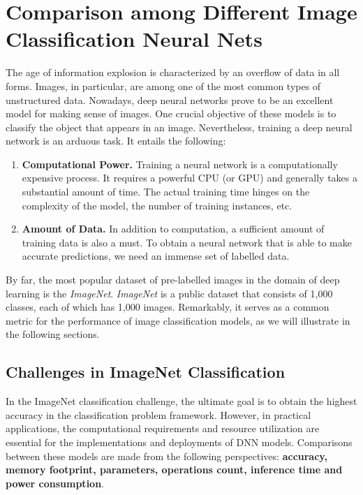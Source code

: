 \chapter{Comparison among Different Image Classification Neural Nets}
The age of information explosion is characterized by an overflow of data in all forms. Images, in particular, are among one of the most common types of unstructured data. Nowadays, deep neural networks prove to be an excellent model for making sense of images. One crucial objective of these models is to classify the object that appears in an image. Nevertheless, training a deep neural network is an arduous task. It entails the following:

\begin{enumerate}
    \item \textbf{Computational Power.}
    Training a neural network is a computationally expensive process. It requires a powerful CPU (or GPU) and generally takes a substantial amount of time. The actual training time hinges on the complexity of the model, the number of training instances, etc.
    \item \textbf{Amount of Data.}
    In addition to computation, a sufficient amount of training data is also a must. To obtain a neural network that is able to make accurate predictions, we need an immense set of labelled data.
\end{enumerate}

By far, the most popular dataset of pre-labelled images in the domain of deep learning is the \textit{ImageNet}. \textit{ImageNet} is a public dataset that consists of 1,000 classes, each of which has 1,000 images. Remarkably, it serves as a common metric for the performance of image classification models, as we will illustrate in the following sections.

\section{Challenges in ImageNet Classification}
In the ImageNet classification challenge, the ultimate goal is to obtain the highest accuracy in the classification problem framework. However, in practical applications, the computational requirements and resource utilization are essential for the implementations and deployments of DNN models. Comparisons between these models are made from the following perspectives: \textbf{accuracy, memory footprint, parameters, operations count, inference time and power consumption}.

